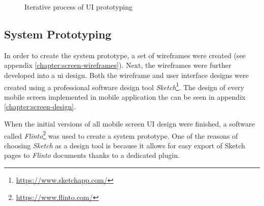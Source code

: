     \begin{figure}[ht]
    \centering
    \caption{Iterative process of UI prototyping}
    \label{figure:ui-design-process}
    \end{figure}
    
        \subsection{System Prototyping}
        In order to create the system prototype, a set of wireframes were created (see appendix \ref{chapter:screen-wireframes}). Next, the wireframes were further developed into a \gls{ui} design. Both the wireframe and user interface designs were created using a professional software design tool \textit{Sketch}\footnote{\url{https://www.sketchapp.com/}}. The design of every mobile screen implemented in mobile application the can be seen in appendix \ref{chapter:screen-design}. 
        
        When the initial versions of all mobile screen UI design were finished, a software called \textit{Flinto}\footnote{\url{https://www.flinto.com/}} was used to create a system prototype. One of the reasons of choosing \textit{Sketch} as a design tool is because it allows for easy export of Sketch pages to \textit{Flinto} documents thanks to a dedicated plugin.
        
